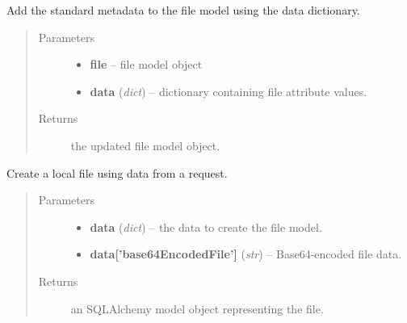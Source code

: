 \documentclass[letterpaper,10pt,english]{sphinxmanual}
\begin{document}

\begin{fulllineitems}
\label{api:onlinelinguisticdatabase.controllers.files.addStandardMetadata}
Add the standard metadata to the file model using the data dictionary.
\begin{quote}\begin{description}
\item[{Parameters}] \leavevmode\begin{itemize}
\item {} 
\textbf{file} -- file model object

\item {} 
\textbf{data} (\emph{dict}) -- dictionary containing file attribute values.

\end{itemize}

\item[{Returns}] \leavevmode
the updated file model object.

\end{description}\end{quote}

\end{fulllineitems}


\begin{fulllineitems}
\label{api:onlinelinguisticdatabase.controllers.files.createBase64File}
Create a local file using data from a  request.
\begin{quote}\begin{description}
\item[{Parameters}] \leavevmode\begin{itemize}
\item {} 
\textbf{data} (\emph{dict}) -- the data to create the file model.

\item {} 
\textbf{data{[}'base64EncodedFile'{]}} (\emph{str}) -- Base64-encoded file data.

\end{itemize}

\item[{Returns}] \leavevmode
an SQLAlchemy model object representing the file.

\end{description}\end{quote}

\end{fulllineitems}
\end{document}
